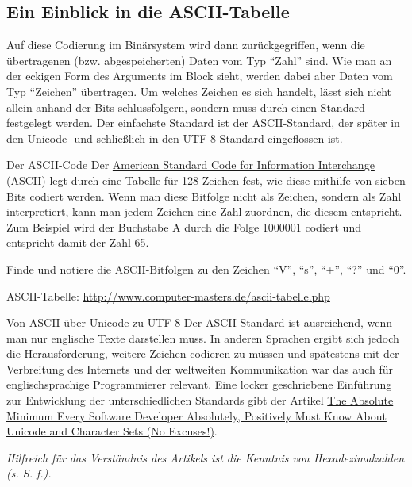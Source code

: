 \subsection{Ein Einblick in die ASCII-Tabelle}
Auf diese Codierung im Binärsystem wird dann zurückgegriffen, wenn die übertragenen (bzw. abgespeicherten) Daten vom Typ \enquote{Zahl} sind. Wie man an der eckigen Form des Arguments im Block  sieht, werden dabei aber Daten vom Typ \enquote{Zeichen} übertragen. Um welches Zeichen es sich handelt, lässt sich nicht allein anhand der Bits schlussfolgern, sondern muss durch einen Standard festgelegt werden. Der einfachste Standard ist der ASCII-Standard, der später in den Unicode- und schließlich in den UTF-8-Standard eingeflossen ist.

\begin{zsfg}{Der ASCII-Code}
	Der \href{http://www.computer-masters.de/ascii-tabelle.php}{American Standard Code for Information Interchange (ASCII)} legt durch eine Tabelle für 128 Zeichen fest, wie diese mithilfe von sieben Bits codiert werden. Wenn man diese Bitfolge nicht als Zeichen, sondern als Zahl interpretiert, kann man jedem Zeichen eine Zahl zuordnen, die diesem entspricht. Zum Beispiel wird der Buchstabe A durch die Folge 1000001 codiert und entspricht damit der Zahl 65.
\end{zsfg}

\begin{aufgabe}
	Finde und notiere die ASCII-Bitfolgen zu den Zeichen \enquote{V}, \enquote{s}, \enquote{+}, \enquote{?} und \enquote{0}.
	
	ASCII-Tabelle: \url{http://www.computer-masters.de/ascii-tabelle.php}
\end{aufgabe}

\begin{recherche}{Von ASCII über Unicode zu UTF-8}
	Der ASCII-Standard ist ausreichend, wenn man nur englische Texte darstellen muss. In anderen Sprachen ergibt sich jedoch die Herausforderung, weitere Zeichen codieren zu müssen und spätestens mit der Verbreitung des Internets und der weltweiten Kommunikation war das auch für englischsprachige Programmierer relevant. Eine locker geschriebene Einführung zur Entwicklung der unterschiedlichen Standards gibt der Artikel \href{https://www.joelonsoftware.com/2003/10/08/the-absolute-minimum-every-software-developer-absolutely-positively-must-know-about-unicode-and-character-sets-no-excuses/}{The Absolute Minimum Every Software Developer Absolutely, Positively Must Know About Unicode and Character Sets (No Excuses!)}.
	
	\emph{Hilfreich für das Verständnis des Artikels ist die Kenntnis von Hexadezimalzahlen (s. S. \pageref{proj:rgbled2} f.).}
\end{recherche}

